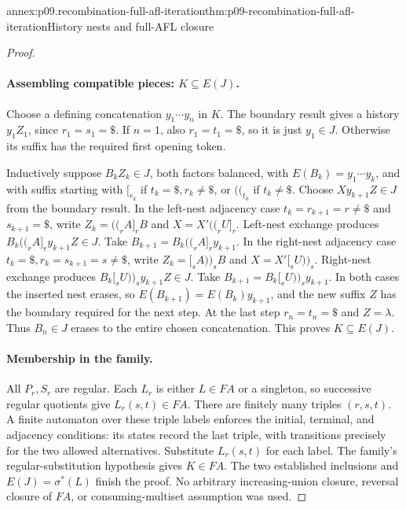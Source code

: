 \begin{annexitem}{annex:p09.recombination-full-afl-iteration}{thm:p09-recombination-full-afl-iteration}{History nests and full-AFL closure}
\begin{proof}
\paragraph{Assembling compatible pieces: \(K\subseteq E(J)\).}
Choose a defining concatenation \(y_1\cdots y_n\) in \(K\).
The boundary result gives a history \(y_1Z_1\), since
\(r_1=s_1=\$\). If \(n=1\), also \(r_1=t_1=\$\), so it is just
\(y_1\in J\). Otherwise its suffix has the required first opening token.

Inductively suppose \(B_kZ_k\in J\), both factors balanced, with
\(E(B_k)=y_1\cdots y_k\), and with suffix starting with \([_{r_k}\)
if \(t_k=\$,r_k\ne\$\), or \(\mathopen{(\!(}_{t_k}\) if \(t_k\ne\$\).
Choose \(Xy_{k+1}Z\in J\) from the boundary result.
In the left-nest adjacency case \(t_k=r_{k+1}=r\ne\$\) and
\(s_{k+1}=\$\), write
\(Z_k=\mathopen{(\!(}_rA]_rB\) and \(X=X'\mathopen{(\!(}_rU]_r\).
Left-nest exchange produces
\(B_k\mathopen{(\!(}_rA]_ry_{k+1}Z\in J\).
Take \(B_{k+1}=B_k\mathopen{(\!(}_rA]_ry_{k+1}\).
In the right-nest adjacency case \(t_k=\$,r_k=s_{k+1}=s\ne\$\),
write \(Z_k=[_sA\mathclose{)\!)}_sB\) and \(X=X'[_sU\mathclose{)\!)}_s\).
Right-nest exchange produces
\(B_k[_sU\mathclose{)\!)}_sy_{k+1}Z\in J\).
Take \(B_{k+1}=B_k[_sU\mathclose{)\!)}_sy_{k+1}\).
In both cases the inserted nest erases, so
\(E(B_{k+1})=E(B_k)y_{k+1}\), and the new suffix \(Z\)
has the boundary required for the next step.
At the last step \(r_n=t_n=\$\) and \(Z=\lambda\).
Thus \(B_n\in J\) erases to the entire chosen concatenation.
This proves \(K\subseteq E(J)\).

\paragraph{Membership in the family.}
All \(P_r,S_r\) are regular. Each \(L_r\) is either \(L\in FA\)
or a singleton, so successive regular quotients give
\(L_r(s,t)\in FA\).
There are finitely many triples \((r,s,t)\). A finite automaton over
these triple labels enforces the initial, terminal, and adjacency conditions:
its states record the last triple, with transitions precisely for the
two allowed alternatives. Substitute \(L_r(s,t)\) for each label.
The family's regular-substitution hypothesis gives \(K\in FA\).
The two established inclusions and \(E(J)=\sigma^*(L)\) finish the proof.
No arbitrary increasing-union closure, reversal closure of \(FA\),
or consuming-multiset assumption was used.
\end{proof}
\end{annexitem}

